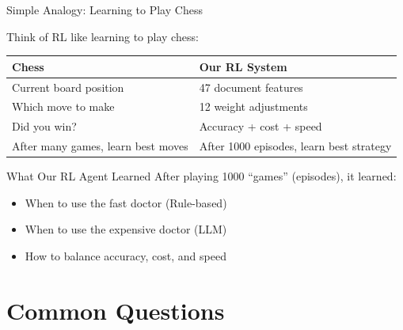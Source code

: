 \documentclass[aspectratio=169]{beamer}
\begin{document}
\begin{frame}{Simple Analogy: Learning to Play Chess \faChess}
\begin{block}{Think of RL like learning to play chess:}
\end{block}

\vspace{0.5cm}

\begin{table}
\centering
\begin{tabular}{ll}
\toprule
\textbf{Chess} & \textbf{Our RL System} \\
\midrule
Current board position & 47 document features \\
Which move to make & 12 weight adjustments \\
Did you win? & Accuracy + cost + speed \\
After many games, learn best moves & After 1000 episodes, learn best strategy \\
\bottomrule
\end{tabular}
\end{table}

\vspace{0.5cm}

\begin{exampleblock}{What Our RL Agent Learned}
After playing 1000 ``games'' (episodes), it learned:
\begin{itemize}
    \item When to use the fast doctor (Rule-based)
    \item When to use the expensive doctor (LLM)
    \item How to balance accuracy, cost, and speed
\end{itemize}
\end{exampleblock}
\end{frame}

\section{Common Questions}
\end{document}
